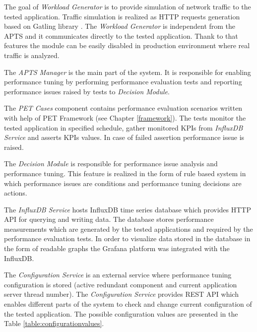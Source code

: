 \documentclass[10pt,a4paper]{article}
\begin{document}
The goal of \textit{Workload Generator} is to provide simulation of network traffic to the tested application. Traffic simulation is realized as HTTP requests generation based on Gatling library \cite{gatling}. The \textit{Workload Generator} is independent from the APTS and it communicates directly to the tested application. Thank to that features the module can be easily disabled in production environment where real traffic is analyzed.  

The \textit{APTS Manager} is the main part of the system. It is responsible for enabling performance tuning by performing performance evaluation tests and reporting performance issues raised by tests to \textit{Decision Module}. 

The \textit{PET Cases} component contains performance evaluation scenarios written with help of PET Framework (see Chapter \ref{framework}). The tests monitor the tested application in specified schedule, gather monitored KPIs from \textit{InfluxDB Service} and asserts KPIs values. In case of failed assertion performance issue is raised.

The \textit{Decision Module} is responsible for performance issue analysis and performance tuning. This feature is realized in the form of rule based system in which performance issues are conditions and performance tuning decisions are actions.   

The \textit{InfluxDB Service} hosts InfluxDB \cite{influxdb} time series database which provides HTTP API for querying and writing data. The database stores performance measurements which are generated by the tested applications and required by the performance evaluation tests. In order to visualize data stored in the database in the form of readable graphs the Grafana \cite{grafana} platform was integrated with the InfluxDB. 

The \textit{Configuration Service} is an external service where performance tuning configuration is stored (active redundant component and current application server thread number). The \textit{Configuration Service} provides REST API which enables different parts of the system to check and change current configuration of the tested application. The possible configuration values are presented in the Table \ref{table:configurationvalues}.
\end{document}
